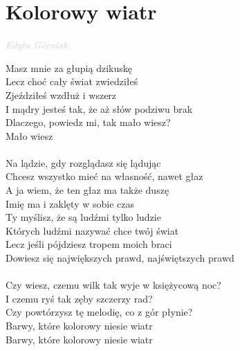 \documentclass[a5paper, 10pt]{book}
\begin{document}
\newpage
\section{Kolorowy wiatr}\textcolor{lightgray}{\textit{Edyta Górniak}}\vspace*{1.5mm}\\
\begin{minipage}[t]{0.8\textwidth}
\hspace*{3mm}Masz mnie za głupią dzikuskę\\
\hspace*{3mm}Lecz choć cały świat zwiedziłeś\\
\hspace*{3mm}Zjeździłeś wzdłuż i wszerz\\
\hspace*{3mm}I mądry jesteś tak, że aż słów podziwu brak\\
\hspace*{3mm}Dlaczego, powiedz mi, tak mało wiesz?\\
\hspace*{3mm}Mało wiesz\\
\\
Na lądzie, gdy rozglądasz się lądując\\
Chcesz wszystko mieć na własność, nawet głaz\\
A ja wiem, że ten głaz ma także duszę\\
Imię ma i zaklęty w sobie czas\vspace*{1.5mm}\\
Ty myślisz, że są ludźmi tylko ludzie\\
Których ludźmi nazywać chce twój świat\\
Lecz jeśli pójdziesz tropem moich braci \\
Dowiesz się największych prawd, najświętszych prawd \\
\\
\hspace*{5mm}Czy wiesz, czemu wilk tak wyje w księżycową noc?\\
\hspace*{5mm}I czemu ryś tak zęby szczerzy rad?\\
\hspace*{5mm}Czy powtórzysz tę melodię, co z gór płynie?\\
\hspace*{5mm}Barwy, które kolorowy niesie wiatr\\
\hspace*{5mm}Barwy, które kolorowy niesie wiatr\\

\end{minipage}
\end{document}
